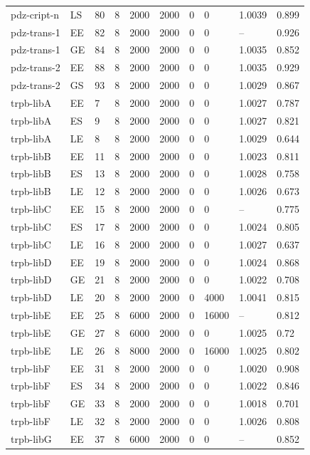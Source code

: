 \begin{longtable}[c]{llllllllll}
pdz-cript-n & LS & 80 & 8 & 2000 & 2000 & 0 & 0 & 1.0039 & 0.899 \\
pdz-trans-1 & EE & 82 & 8 & 2000 & 2000 & 0 & 0 & -- & 0.926 \\
pdz-trans-1 & GE & 84 & 8 & 2000 & 2000 & 0 & 0 & 1.0035 & 0.852 \\
pdz-trans-2 & EE & 88 & 8 & 2000 & 2000 & 0 & 0 & 1.0035 & 0.929 \\
pdz-trans-2 & GS & 93 & 8 & 2000 & 2000 & 0 & 0 & 1.0029 & 0.867 \\
trpb-libA & EE & 7 & 8 & 2000 & 2000 & 0 & 0 & 1.0027 & 0.787 \\
trpb-libA & ES & 9 & 8 & 2000 & 2000 & 0 & 0 & 1.0027 & 0.821 \\
trpb-libA & LE & 8 & 8 & 2000 & 2000 & 0 & 0 & 1.0029 & 0.644 \\
trpb-libB & EE & 11 & 8 & 2000 & 2000 & 0 & 0 & 1.0023 & 0.811 \\
trpb-libB & ES & 13 & 8 & 2000 & 2000 & 0 & 0 & 1.0028 & 0.758 \\
trpb-libB & LE & 12 & 8 & 2000 & 2000 & 0 & 0 & 1.0026 & 0.673 \\
trpb-libC & EE & 15 & 8 & 2000 & 2000 & 0 & 0 & -- & 0.775 \\
trpb-libC & ES & 17 & 8 & 2000 & 2000 & 0 & 0 & 1.0024 & 0.805 \\
trpb-libC & LE & 16 & 8 & 2000 & 2000 & 0 & 0 & 1.0027 & 0.637 \\
trpb-libD & EE & 19 & 8 & 2000 & 2000 & 0 & 0 & 1.0024 & 0.868 \\
trpb-libD & GE & 21 & 8 & 2000 & 2000 & 0 & 0 & 1.0022 & 0.708 \\
trpb-libD & LE & 20 & 8 & 2000 & 2000 & 0 & 4000 & 1.0041 & 0.815 \\
trpb-libE & EE & 25 & 8 & 6000 & 2000 & 0 & 16000 & -- & 0.812 \\
trpb-libE & GE & 27 & 8 & 6000 & 2000 & 0 & 0 & 1.0025 & 0.72 \\
trpb-libE & LE & 26 & 8 & 8000 & 2000 & 0 & 16000 & 1.0025 & 0.802 \\
trpb-libF & EE & 31 & 8 & 2000 & 2000 & 0 & 0 & 1.0020 & 0.908 \\
trpb-libF & ES & 34 & 8 & 2000 & 2000 & 0 & 0 & 1.0022 & 0.846 \\
trpb-libF & GE & 33 & 8 & 2000 & 2000 & 0 & 0 & 1.0018 & 0.701 \\
trpb-libF & LE & 32 & 8 & 2000 & 2000 & 0 & 0 & 1.0026 & 0.808 \\
trpb-libG & EE & 37 & 8 & 6000 & 2000 & 0 & 0 & -- & 0.852 \\

\end{longtable}
